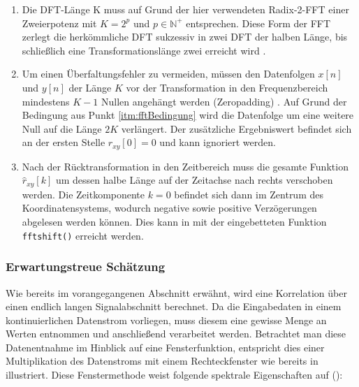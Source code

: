 \begin{enumerate}
    \item\label{itm:fftBedingung} Die DFT-Länge K muss auf Grund der hier verwendeten Radix-2-FFT einer Zweierpotenz mit $K = 2^p$ und $p \in  \mathbb{N}^{+}$ entsprechen. Diese Form der FFT zerlegt die herkömmliche DFT sukzessiv in zwei DFT der halben Länge, bis schließlich eine Transformationslänge zwei erreicht wird \cite[S. 222 ff]{Book_SigSys_Werner}.
    
     \item Um einen Überfaltungsfehler zu vermeiden, müssen den Datenfolgen $x[n]$ und $y[n]$ der Länge $K$ vor der Transformation in den Frequenzbereich mindestens $K-1$ Nullen angehängt werden (Zeropadding) \cite[S. 215 ff]{Book_SigSys_Werner}. Auf Grund der Bedingung aus Punkt \ref{itm:fftBedingung} wird die Datenfolge um eine weitere Null auf die Länge $2K$ verlängert. Der zusätzliche Ergebniswert befindet sich an der ersten Stelle $\hat r_{xy}[0] = 0$ und kann ignoriert werden.
     
     
     \item Nach der Rücktransformation in den Zeitbereich muss die gesamte Funktion $\hat r_{xy}[k]$ um dessen halbe Länge auf der Zeitachse nach rechts verschoben werden. Die Zeitkomponente $k=0$ befindet sich dann im Zentrum des Koordinatensystems, wodurch negative sowie positive Verzögerungen abgelesen werden können. Dies kann \zB in \matlab mit der eingebetteten Funktion \texttt{fftshift()} erreicht werden.
\end{enumerate}


			
\subsubsection{Erwartungstreue Schätzung}
\label{subsubsec:ErwartungstreueSchaetzung}
Wie bereits im vorangegangenen Abschnitt erwähnt, wird eine Korrelation über einen endlich langen Signalabschnitt berechnet. Da die Eingabedaten in einem kontinuierlichen Datenstrom vorliegen, muss diesem eine gewisse Menge an Werten entnommen und anschließend verarbeitet werden. Betrachtet man diese Datenentnahme im Hinblick auf eine Fensterfunktion, entspricht dies einer Multiplikation des Datenstroms mit einem Rechteckfenster wie bereits in  illustriert. Diese Fenstermethode weist folgende spektrale Eigenschaften auf (\vgl \cite[S. 301]{Book_SignalProcessing_Kammayer}):


